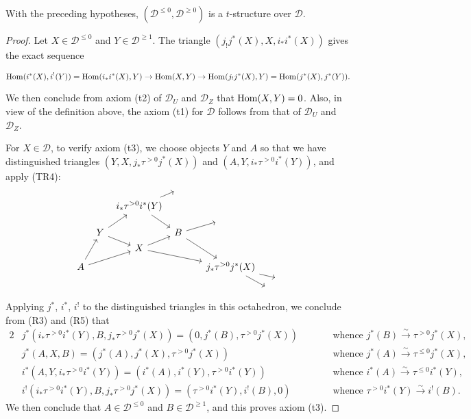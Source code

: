 \begin{theorem}\label{triangle cat recollement theorem}
With the preceding hypotheses, $(\mathcal{D}^{\leq 0},\mathcal{D}^{\geq 0})$ is a $t$-structure over $\mathcal{D}$.
\end{theorem}
\begin{proof}
Let $X\in\mathcal{D}^{\leq 0}$ and $Y\in\mathcal{D}^{\geq 1}$. The triangle $(j_!j^*(X),X,i_*i^*(X))$ gives the exact sequence
\begin{small}
\[\mathrm{Hom}(i^*(X),i^!(Y))=\mathrm{Hom}(i_*i^*(X),Y)\to \mathrm{Hom}(X,Y)\to\mathrm{Hom}(j_!j^*(X),Y)=\mathrm{Hom}(j^*(X),j^*(Y)).\]
\end{small}
We then conclude from axiom (t2) of $\mathcal{D}_U$ and $\mathcal{D}_Z$ that $\mathrm{Hom}(X,Y)=0$. Also, in view of the definition above, the axiom (t1) for $\mathcal{D}$ follows from that of $\mathcal{D}_U$ and $\mathcal{D}_Z$.\par
For $X\in\mathcal{D}$, to verify axiom (t3), we choose objects $Y$ and $A$ so that we have distinguished triangles $(Y,X,j_*\tau^{>0}j^*(X))$ and $(A,Y,i_*\tau^{>0}i^*(Y))$, and apply (TR4):
\vspace*{-2mm}
\begin{equation*}
\begin{tikzcd}[row sep=2pt,column sep=4pt]
&&&{}&\\
&&i_*\tau^{>0}i^*(Y)\ar[ru]\ar[rdd]&&\\
&&&{}&{}&{\hspace*{8mm}}\\
&Y\ar[rd]\ar[ruu]&&B\ar[rru]\ar[rrddd]\\
&&X\ar[ru]\ar[rrrdd]&&\\
&&&&\\
A\ar[ruuu]\ar[rruu]&&&&&j_*\tau^{>0}j^*(X)\ar[rdd]\ar[rrd]\\
&&&&&&&{}\\
&&&&&&{}&
\end{tikzcd}
\vspace*{-3mm}
\end{equation*}
Applying $j^*$, $i^*$, $i^!$ to the distinguished triangles in this octahedron, we conclude from (R3) and (R5) that
\begin{alignat*}{2}
&j^*(i_*\tau^{>0}i^*(Y),B,j_*\tau^{>0}j^*(X))=(0,j^*(B),\tau^{>0}j^*(X))&\quad\quad&\text{whence $j^*(B)\stackrel{\sim}{\to} \tau^{>0}j^*(X)$},\\
&j^*(A,X,B)=(j^*(A),j^*(X),\tau^{>0}j^*(X))&\quad\quad&\text{whence $j^*(A)\stackrel{\sim}{\to} \tau^{\leq 0}j^*(X)$},\\
&i^*(A,Y,i_*\tau^{>0}i^*(Y))=(i^*(A),i^*(Y),\tau^{>0}i^*(Y))&\quad\quad&\text{whence $i^*(A)\stackrel{\sim}{\to} \tau^{\leq 0}i^*(Y)$},\\
&i^!(i_*\tau^{>0}i^*(Y),B,j_*\tau^{>0}j^*(X))=(\tau^{>0}i^*(Y),i^!(B),0)&\quad\quad&\text{whence $\tau^{>0}i^*(Y)\stackrel{\sim}{\to} i^!(B)$}.
\end{alignat*}
We then conclude that $A\in\mathcal{D}^{\leq 0}$ and $B\in\mathcal{D}^{\geq 1}$, and this proves axiom (t3).
\end{proof}

